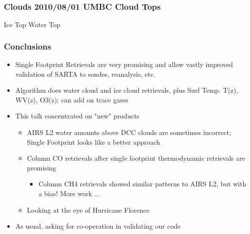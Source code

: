 \documentclass[10pt,t]{beamer}
\begin{document}

\begin{frame}
  \frametitle{Clouds 2010/08/01 UMBC Cloud Tops}

  Ice Top  \hspace{2.0in} Water Top\\
  \begin{center}
  \end{center}
\end{frame}
\begin{frame}
  \frametitle{Conclusions}
  \begin{itemize}
  \item Single Footprint Retrievals are very promising and allow vastly improved validation of SARTA to sondes, reanalysis, etc.
  \item Algorithm does water cloud and ice cloud retrievals, plus Surf Temp. T(z), WV(z), O3(z); can add on trace gases
  \item This talk concentrated on "new" products
    \begin{itemize}
    \item AIRS L2 water amounts above DCC clouds are sometimes incorrect; Single Footprint looks like a better approach
    \item Column CO retrievals after single footprint thermodynamic retrievals are promising
    \begin{itemize}
      \item Column CH4 retrievals showed similar patterns to AIRS L2, but with a bias! More work ...
    \end{itemize}
    \item Looking at the eye of Hurricane Florence
    \end{itemize}
  \item As usual, asking for co-operation in validating our code
  \end{itemize}
\end{frame}
\end{document}
